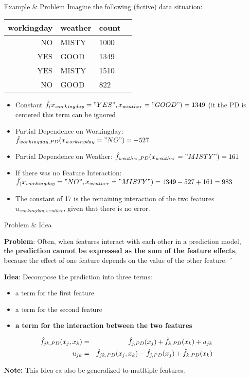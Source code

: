 \documentclass[11pt,compress,t,notes=noshow, aspectratio=169, xcolor=table]{beamer}
\begin{document}
\begin{vbframe}{Example \& Problem}
Imagine the following (fictive) data situation:
\begin{table}[ht]
\centering
\begin{tabular}{rllr}
  \hline
 workingday & weather & count \\ 
  \hline
    NO & MISTY & 1000 \\ 
    YES & GOOD & 1349 \\ 
    YES & MISTY & 1510 \\ 
    NO & GOOD & 822 \\ 
   \hline
\end{tabular}
\end{table}
\begin{itemize}
    \item Constant $\hat{f}_(x_{workingday} = "YES", x_{weather} = "GOOD") = 1349$ (it the PD is centered this term can be ignored
    \item Partial Dependence on Workingday: $\hat{f}_{workingday, PD}(x_{workingday} = "NO") = -527$
    \item Partial Dependence on Weather: $\hat{f}_{weather, PD}(x_{weather} = "MISTY") = 161$
    \item<2> If there was no Feature Interaction: $\hat{f}_(x_{workingday} = "NO", x_{weather} = "MISTY") = 1349 -527 +161 =983$
    \item<2> The constant of 17 is the remaining interaction of the two features $u_{workingday, weather}$, given that there is no error.
\end{itemize}


\end{vbframe}

\begin{vbframe}{Problem \& Idea}
    
    \textbf{Problem}:
	Often, when features interact with each other in a prediction model, the \textbf{prediction cannot be expressed as the sum of the feature effects}, because the effect of one feature depends on the value of the other feature. ´
    \vspace{1cm}
    
    \textbf{Idea}:
       Decompose the prediction into three terms: 
   \begin{itemize}
       \item a term for the first feature
       \item a term for the second feature
       \item \textbf{a term for the interaction between the two features}
   \end{itemize}
    

    \begin{eqnarray}
    \hat{f}_{jk, PD}(x_j, x_k) &=& \hat{f}_{j, PD}(x_j) + \hat{f}_{k, PD}(x_k) + u_{jk} \\
    u_{jk} &=& \hat{f}_{jk, PD}(x_j, x_k) - \hat{f}_{j, PD}(x_j) + \hat{f}_{k, PD}(x_k)  
    \end{eqnarray}
    
    \textbf{Note:} This Idea ca also be generalized to mutltiple features.
	
\end{vbframe}
\end{document}
